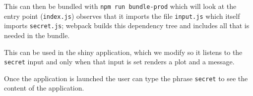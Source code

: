 \documentclass[
  10pt,
]{krantz}
\makeatletter
\newenvironment{Shaded}{\begin{snugshade}}{\end{snugshade}}
\newcommand{\ControlFlowTok}[1]{\textcolor[rgb]{0.27,0.27,0.27}{\textbf{#1}}}
\newcommand{\DataTypeTok}[1]{\textcolor[rgb]{0.27,0.27,0.27}{#1}}
\newcommand{\KeywordTok}[1]{\textcolor[rgb]{0.27,0.27,0.27}{\textbf{#1}}}
\newcommand{\NormalTok}[1]{#1}
\newcommand{\OperatorTok}[1]{\textcolor[rgb]{0.43,0.43,0.43}{\textbf{#1}}}
\newcommand{\StringTok}[1]{\textcolor[rgb]{0.5,0.5,0.5}{#1}}
\newenvironment{kframe}{%
\medskip{}
\setlength{\fboxsep}{.8em}
 \def\at@end@of@kframe{}%
 \ifinner\ifhmode%
  \def\at@end@of@kframe{\end{minipage}}%
  \begin{minipage}{\columnwidth}%
 \fi\fi%
 \def\FrameCommand##1{\hskip\@totalleftmargin \hskip-\fboxsep
 \colorbox{shadecolor}{##1}\hskip-\fboxsep
     \hskip-\linewidth \hskip-\@totalleftmargin \hskip\columnwidth}%
 \MakeFramed {\advance\hsize-\width
   \@totalleftmargin\z@ \linewidth\hsize
   \@setminipage}}%
 {\par\unskip\endMakeFramed%
 \at@end@of@kframe}
\renewenvironment{Shaded}{\begin{kframe}}{\end{kframe}}
\makeatother
\begin{document}
This can then be bundled with \texttt{npm\ run\ bundle-prod} which will look at the entry point (\texttt{index.js}) observes that it imports the file \texttt{input.js} which itself imports \texttt{secret.js}; webpack builds this dependency tree and includes all that is needed in the bundle.

This can be used in the shiny application, which we modify so it listens to the \texttt{secret} input and only when that input is set renders a plot and a message.

\begin{Shaded}
\end{Shaded}

Once the application is launched the user can type the phrase \texttt{secret} to see the content of the application.
\end{document}
